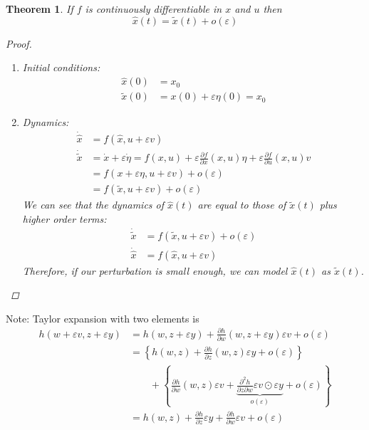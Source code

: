 \documentclass[letterpaper,12pt,titlepage]{report}
\newcommand*\pder[2]{\frac{\partial #1}{\partial #2}}
\theoremstyle{plain}
\newtheorem*{thm}{Theorem}
\theoremstyle{definition}
\begin{document}
\begin{thm}
  If $f$ is continuously differentiable in $x$ and $u$ then
  \[ \hat x(t) = \tilde x(t) + o(\varepsilon) \]
  \begin{proof}
    \mbox{}
    \begin{enumerate}[label=\roman*)]
    \item Initial conditions:
      \begin{align}
        \hat x(0) &= x_0 \\
        \tilde x(0) &= x(0) + \varepsilon \eta(0) = x_0
      \end{align}
    \item Dynamics:
      \begin{align}
        \dot{\hat x} &= f(\hat x,u+\varepsilon v) \\
        \dot{\tilde x} &= \dot x + \varepsilon \dot \eta = f(x,u) + \varepsilon \pder{f}{x}(x,u)\eta + \varepsilon \pder{f}{u}(x,u) v \\
                     &= f(x+\varepsilon\eta,u+\varepsilon v) + o(\varepsilon) \\
                     &= f(\tilde x,u+\varepsilon v) + o(\varepsilon)
      \end{align}
      We can see that the dynamics of $\hat x(t)$ are equal to those of $\tilde x(t)$ plus higher order terms:
      \begin{align}
        \dot{\tilde x} &= f(\tilde x,u+\varepsilon v) + o(\varepsilon) \\
        \dot{\hat x} &= f(\hat x,u+\varepsilon v)
      \end{align}
      Therefore, if our perturbation is small enough, we can model $\hat x(t)$ as $\tilde x(t)$.
    \end{enumerate}
  \end{proof}
\end{thm}

\begin{framed}
  \hypertarget{taylor_2var}{}
  Note: Taylor expansion with two elements is
  \begin{align}
    h(w+\varepsilon v,z+\varepsilon y) &= h(w,z+\varepsilon y) + \pder{h}{w}(w,z+\varepsilon y)\varepsilon v + o(\varepsilon) \\
                                       &= \left\{ h(w,z) + \pder{h}{z}(w,z)\varepsilon y + o(\varepsilon) \right\} \\
                                       & \qquad + \left\{ \pder{h}{w}(w,z)\varepsilon v + \underbrace{\pder{^2 h}{z\partial w}\varepsilon v \odot \varepsilon y}_{o(\varepsilon)} + o(\varepsilon) \right\} \\
                                       &= h(w,z) + \pder{h}{z}\varepsilon y + \pder{h}{w}\varepsilon v + o(\varepsilon)
  \end{align}
\end{framed}
\end{document}
